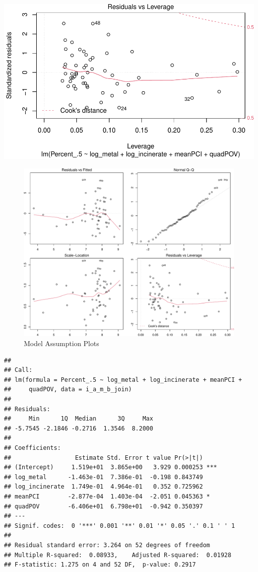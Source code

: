 \documentclass[
  12pt,
]{article}
\begin{document}
\includegraphics{Alcorn_Bao_Hermanson_ENV872_Project_files/figure-latex/analysis tools2-4.pdf}

\begin{figure}

\includegraphics{Alcorn_Bao_Hermanson_ENV872_Project_files/figure-latex/analyis final-1} \hfill{}

\caption{Model Assumption Plots}\label{fig:analyis final}
\end{figure}

\begin{verbatim}
## 
## Call:
## lm(formula = Percent_.5 ~ log_metal + log_incinerate + meanPCI + 
##     quadPOV, data = i_a_m_b_join)
## 
## Residuals:
##     Min      1Q  Median      3Q     Max 
## -5.7545 -2.1846 -0.2716  1.3546  8.2000 
## 
## Coefficients:
##                  Estimate Std. Error t value Pr(>|t|)    
## (Intercept)     1.519e+01  3.865e+00   3.929 0.000253 ***
## log_metal      -1.463e-01  7.386e-01  -0.198 0.843749    
## log_incinerate  1.749e-01  4.964e-01   0.352 0.725962    
## meanPCI        -2.877e-04  1.403e-04  -2.051 0.045363 *  
## quadPOV        -6.406e+01  6.798e+01  -0.942 0.350397    
## ---
## Signif. codes:  0 '***' 0.001 '**' 0.01 '*' 0.05 '.' 0.1 ' ' 1
## 
## Residual standard error: 3.264 on 52 degrees of freedom
## Multiple R-squared:  0.08933,    Adjusted R-squared:  0.01928 
## F-statistic: 1.275 on 4 and 52 DF,  p-value: 0.2917
\end{verbatim}
\end{document}
